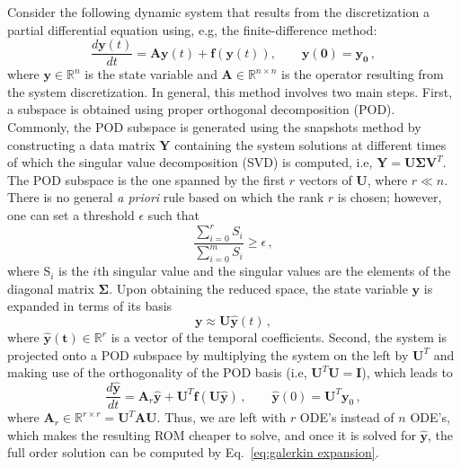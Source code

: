 \documentclass[]{interact}
\theoremstyle{plain}%
\theoremstyle{definition}
\theoremstyle{remark}
\begin{document}
Consider the following dynamic system that results from the discretization a partial differential equation using, e.g, the finite-difference method:
\begin{equation}
	\frac{d\mathbf{y}(t)}{dt} = \mathbf{A}\mathbf{y}(t) + \mathbf{f}(\mathbf{y}(t)),  \quad\quad \mathbf{y(0) = \mathbf{y_0}} \, ,
	\label{eq:FOM}
\end{equation}
where $\mathbf{y} \in \mathbb{R}^{n}$ is the state variable and $\mathbf{A} \in \mathbb{R}^{n\times n}$ is the operator resulting from the system discretization.
In general, this method involves two main steps.
First, a subspace is obtained using proper orthogonal decomposition (POD)\cite{volkwein2011model}.
Commonly, the POD subspace is generated using the snapshots method \cite{sirovich1987turbulence} by constructing a data matrix $\mathbf{Y}$ containing the system solutions at different times of which the singular value decomposition (SVD) is computed, i.e, $\mathbf{Y} = \mathbf{U}\mathbf{\Sigma}\mathbf{V}^T$.
The POD subspace is the one spanned by the first $r$ vectors of $\mathbf{U}$, where $r \ll n$.
There is no general \textit{a priori} rule based on which the rank $r$ is chosen; however, one can set a threshold $\epsilon$  such that
\begin{equation}
	\frac{\sum_{i=0}^r S_i}{\sum_{i=0}^m S_i} \ge \epsilon \, ,
\end{equation}
where S$_i$ is the $i$th singular value and the singular values are the elements of the diagonal matrix $\mathbf{\Sigma}$.
Upon obtaining the reduced space, the state variable $\mathbf{y}$ is expanded in terms of its basis
\begin{equation}
	\mathbf{y} \approx \mathbf{U} \hat{\mathbf{y}}(t) \, ,
	\label{eq:galerkin expansion}
\end{equation}
where $\mathbf{\hat{y}(t)} \in \mathbb{R}^{r}$ is a vector of the temporal coefficients.
Second, the system is projected onto a POD subspace by multiplying the system on the left by $\mathbf{U}^T$ and making use of the orthogonality of the POD basis (i.e, $\mathbf{U}^T\mathbf{U} = \mathbf{I}$), which leads to
\begin{equation}
	\frac{d\mathbf{\hat{y}}}{dt} = \mathbf{A}_r\mathbf{\hat{y}} + \mathbf{U}^T\mathbf{f}(\mathbf{U}\mathbf{\hat{y}})\, ,  \qquad \mathbf{\hat{y}}(0) = \mathbf{U}^T\mathbf{y}_0 \, ,
	\label{eq:ROM}
\end{equation}
where $\mathbf{A}_r \in \mathbb{R}^{r\times r} = \mathbf{U}^T\mathbf{A}\mathbf{U}.$
Thus, we are left with $r$ ODE's instead of $n$ ODE's, which makes the resulting ROM cheaper to solve, and once it is solved for $\mathbf{\hat{y}}$, the full order solution can be computed by Eq.~\ref{eq:galerkin expansion}.
\end{document}
